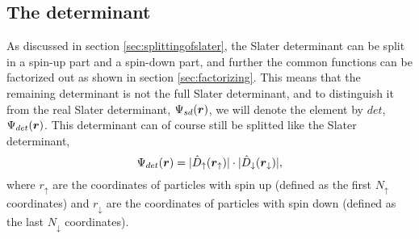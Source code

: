 \subsection{The determinant} \label{sec:slaterdeterminant}
As discussed in section \ref{sec:splittingofslater}, the Slater determinant can be split in a spin-up part and a spin-down part, and further the common functions can be factorized out as shown in section \ref{sec:factorizing}. This means that the remaining determinant is not the full Slater determinant, and to distinguish it from the real Slater determinant, $\Psi_{sd}(\boldsymbol{{r}})$, we will denote the element by $det$, $\Psi_{det}(\boldsymbol{{r}})$. This determinant can of course still be splitted like the Slater determinant, 
\begin{equation}
\Psi_{det}(\boldsymbol{{r}})=
|\hat{D}_{\uparrow}(\boldsymbol{{r}}_{\uparrow})|\cdot |\hat{D}_{\downarrow}(\boldsymbol{{r}}_{\downarrow})|,
\end{equation}
where $r_{\uparrow}$ are the coordinates of particles with spin up (defined as the first $N_{\uparrow}$ coordinates) and $r_{\downarrow}$ are the coordinates of particles with spin down (defined as the last $N_{\downarrow}$ coordinates). 

